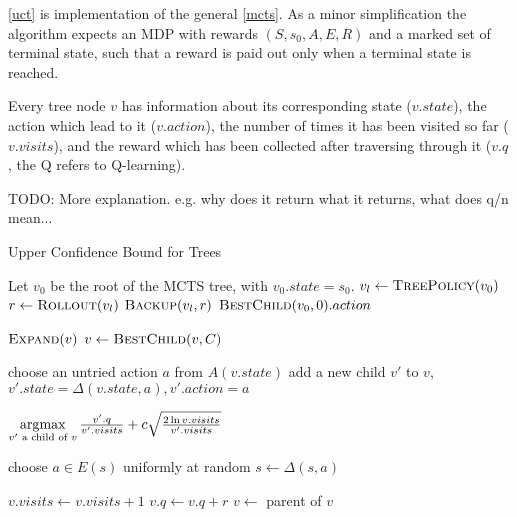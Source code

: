 \autoref{uct} is implementation of the general \autoref{mcts}. As a
minor simplification the algorithm expects an MDP with rewards
$(S,s_0,A,E,R)$ and a marked set of terminal state, such that a reward
is paid out only when a terminal state is reached.

Every tree node $v$ has information about its corresponding state
($v.state$), the action which lead to it ($v.action$), the number of
times it has been visited so far ($v.visits$), and the reward which has
been collected after traversing through it ($v.q$, the Q refers to
Q-learning).

TODO: More explanation. e.g. why does it return what it returns,
what does q/n mean...

\begin{algorithm}
    \caption{Upper Confidence Bound for Trees}
\label{uct}
\begin{algorithmic}
    \State Let $v_0$ be the root of the MCTS tree, with $v_0.state = s_0$.
        \State $v_l \gets \Call{TreePolicy}{v_0}$
        \State $r \gets \Call{Rollout}{v_l}$
        \State $\Call{Backup}{v_l, r}$
    \EndWhile
    \State \Return $\Call{BestChild}{v_0, 0}.action$
\EndFunction

            \State $\Call{Expand}{v}$
        \Else
            \State $v \gets \Call{BestChild}{v, C}$
        \EndIf
    \EndWhile
\EndFunction

    \State choose an untried action $a$ from $A(v.state)$
    \State add a new child $v'$ to $v$,
        $v'.state = \Delta(v.state, a),
        v'.action = a$
\EndFunction

    \State \Return
    $\operatorname*{\arg\!\max}\limits_{v' \text{ a child of } v}
    \frac{v'.q}{v'.visits} +
    c\sqrt{\frac{2\ln v.visits}{v'.visits}}$
\EndFunction

        \State choose $a \in E(s)$ uniformly at random
        \State $s \gets \Delta(s,a)$
    \EndWhile
\EndFunction

        \State $v.visits \gets v.visits + 1$
        \State $v.q \gets v.q + r$
        \State $v \gets$ parent of $v$
    \EndWhile
\EndFunction
\end{algorithmic}
\end{algorithm}

